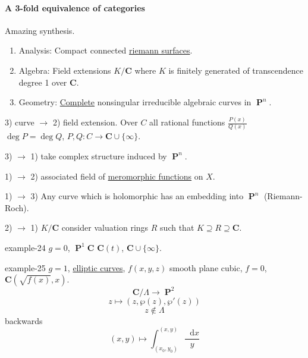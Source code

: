 \documentclass[10pt,]{book}
\numberwithin{equation}{section}
\newcommand{\diff}{\mathop{}\!\mathrm{d}}
\newcommand{\CC}{\mathbf{C}}
\DeclareMathOperator{\PP}{\mathbf{P}}
\begin{document}
\paragraph[{A 3-fold equivalence of categories}]{A 3-fold equivalence of categories}\hypertarget{paragraphs-7}{}
\hypertarget{p-523}{}%
Amazing synthesis.\leavevmode%
\begin{enumerate}
\item\hypertarget{li-103}{}Analysis: Compact connected \hyperref[def-top-riem-surface]{riemann surfaces}.%
\item\hypertarget{li-104}{}Algebra: Field extensions \(K/\CC\) where \(K\) is finitely generated of transcendence degree 1 over \(\CC\).%
\item\hypertarget{li-105}{}Geometry: \hyperref[def-abelian-complete-var]{Complete} nonsingular irreducible algebraic curves in \(\PP^n\).%
\end{enumerate}
%
\par
\hypertarget{p-524}{}%
3) curve \(\to\) 2) field extension. Over \(C\) all rational functions \(\frac{P(x)}{Q(x)}\) \(\deg P= \deg Q\), \(P,Q \colon C\to \CC \cup \{\infty\}\).%
\par
\hypertarget{p-525}{}%
3) \(\to\) 1) take complex structure induced by \(\PP^n\).%
\par
\hypertarget{p-526}{}%
1) \(\to\) 2) associated field of \hyperref[def-morph-riem-surf]{meromorphic functions} on \(X\).%
\par
\hypertarget{p-527}{}%
1) \(\to\) 3) Any curve which is holomorphic has an embedding into \(\PP^n\) (Riemann-Roch).%
\par
\hypertarget{p-528}{}%
2) \(\to\) 1) \(K/\CC\) consider valuation rings \(R\) such that \(K\supseteq R\supseteq \CC\).%
\begin{example}{}{example-24}%
\hypertarget{p-529}{}%
\(g =0\), \(\PP^1 \CC\) \(\CC(t)\), \(\CC\cup \{\infty\}\).%
\end{example}
\begin{example}{}{example-25}%
\hypertarget{p-530}{}%
\(g =1\), \hyperref[def-supersing-isog-ec]{elliptic curves}, \(f(x,y,z)\) smooth plane cubic, \(f= 0\), \(\CC(\sqrt{f(x)}, x)\).%
\begin{equation*}
\CC/\Lambda \to \PP^2
\end{equation*}
%
\begin{equation*}
z\mapsto (z,\wp(z), \wp'(z))
\end{equation*}
%
\begin{equation*}
z\not\in \Lambda
\end{equation*}
backwards%
\begin{equation*}
(x,y) \mapsto \int_{(x_0, y_0)}^{(x,y)} \frac{\diff x}{y}
\end{equation*}
%
\end{example}
%
%
\typeout{************************************************}
\typeout{************************************************}
%
\end{document}
